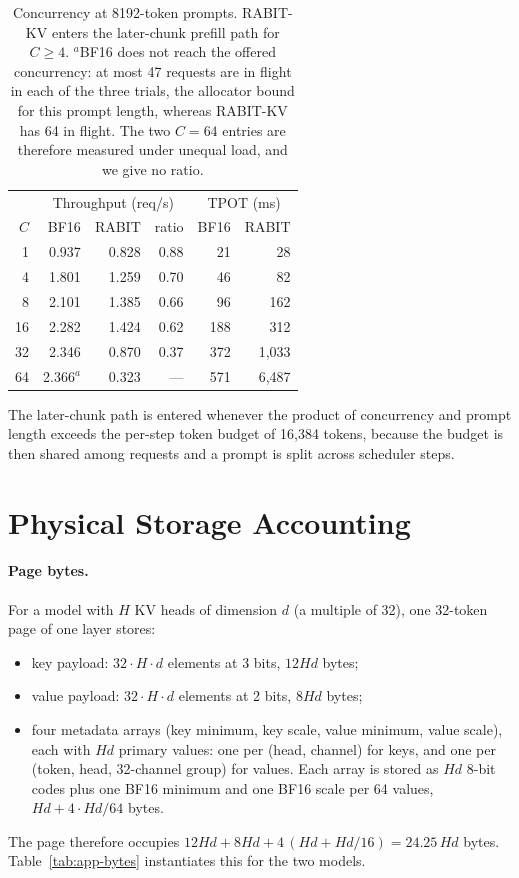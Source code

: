 \documentclass{article}
\begin{document}
\begin{table}[h]
\centering
\small
\setlength{\tabcolsep}{3.5pt}
\begin{tabular}{@{}rrrrrr@{}}
\toprule
 & \multicolumn{3}{c}{Throughput (req/s)} & \multicolumn{2}{c}{TPOT (ms)} \\
$C$ & BF16 & RABIT & ratio & BF16 & RABIT \\
\midrule
1 & 0.937 & 0.828 & 0.88 & 21 & 28 \\
4 & 1.801 & 1.259 & 0.70 & 46 & 82 \\
8 & 2.101 & 1.385 & 0.66 & 96 & 162 \\
16 & 2.282 & 1.424 & 0.62 & 188 & 312 \\
32 & 2.346 & 0.870 & 0.37 & 372 & 1,033 \\
64 & 2.366$^{a}$ & 0.323 & --- & 571 & 6,487 \\
\bottomrule
\end{tabular}
\caption{Concurrency at 8192-token prompts. RABIT-KV enters the later-chunk prefill path for $C \ge 4$.
$^{a}$BF16 does not reach the offered concurrency: at most 47 requests are in flight in each of the
three trials, the allocator bound for this prompt length, whereas RABIT-KV has 64 in flight. The two
$C{=}64$ entries are therefore measured under unequal load, and we give no ratio.}
\label{tab:app-c8192}
\end{table}

The later-chunk path is entered whenever the product of concurrency and prompt length exceeds the
per-step token budget of 16,384 tokens, because the budget is then shared among requests and a prompt
is split across scheduler steps.

\section{Physical Storage Accounting}
\label{app:storage}

\paragraph{Page bytes.}
For a model with $H$ KV heads of dimension $d$ (a multiple of 32), one 32-token page of one layer
stores:
\begin{itemize}
\item key payload: $32 \cdot H \cdot d$ elements at 3 bits, $12Hd$ bytes;
\item value payload: $32 \cdot H \cdot d$ elements at 2 bits, $8Hd$ bytes;
\item four metadata arrays (key minimum, key scale, value minimum, value scale), each with $Hd$
  primary values: one per (head, channel) for keys, and one per (token, head, 32-channel group) for
  values. Each array is stored as $Hd$ 8-bit codes plus one BF16 minimum and one BF16 scale per 64
  values, $Hd + 4 \cdot Hd/64$ bytes.
\end{itemize}
The page therefore occupies $12Hd + 8Hd + 4\,(Hd + Hd/16) = 24.25\,Hd$ bytes.
Table~\ref{tab:app-bytes} instantiates this for the two models.
\end{document}
